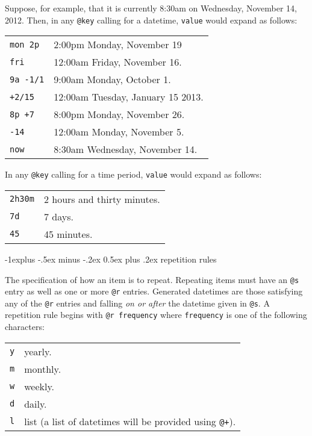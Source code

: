 \documentclass[9pt,landscape]{article}
\makeatletter
\renewcommand{\subsection}{\@startsection{subsection}{2}{0mm}%
                                {-1explus -.5ex minus -.2ex}%
                                {0.5ex plus .2ex}%
                                {\normalfont\normalsize\bfseries}}
\makeatother
\begin{document}
\begin{multicols}{3}
Suppose, for example, that it is currently 8:30am on Wednesday, November 14, 2012. Then, in any \verb!@key! calling for a datetime, \verb!value! would expand as follows:
\vskip 3pt

\begin{tabular}{@{}ll@{}}
\texttt{mon 2p} & 2:00pm Monday, November 19 \\
\texttt{fri} & 12:00am Friday, November 16. \\
\texttt{9a -1/1} & 9:00am Monday, October 1. \\
\texttt{+2/15} & 12:00am Tuesday, January 15 2013. \\
\texttt{8p +7} & 8:00pm Monday, November 26.\\
\texttt{-14} & 12:00am Monday, November 5. \\
\texttt{now} & 8:30am Wednesday, November 14. \\
\end{tabular}

\vskip 3pt
In any \verb!@key! calling for a time period, \verb!value! would expand as follows:
\vskip 3pt

\begin{tabular}{@{}ll@{}}
\texttt{2h30m} & 2 hours and thirty minutes. \\
\texttt{7d} & 7 days. \\
\texttt{45} & 45 minutes. \\
\end{tabular}


\subsection{repetition rules}

The specification of how an item is to repeat. Repeating items must have an \verb!@s! entry as well as one or more \verb!@r! entries. Generated datetimes are those satisfying any of the \verb!@r! entries and falling \emph{on or after} the datetime given in \verb!@s!.
\vskip 3pt
A repetition rule begins with \verb!@r frequency! where \verb!frequency! is one of the following characters:
\vskip 3pt
\begin{tabular}{@{}ll@{}}
\texttt{y} & yearly. \\
\texttt{m} & monthly. \\
\texttt{w} & weekly. \\
\texttt{d} & daily. \\
\texttt{l} & list (a list of datetimes will be provided using \verb!@+!). \\
\end{tabular}


\end{multicols}
\end{document}
